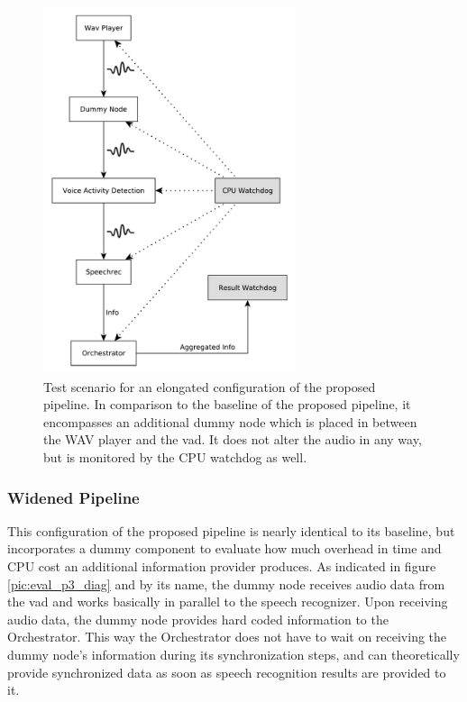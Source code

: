 \begin{figure}[]
	\centering
	\includegraphics[width=0.66\textwidth]{diagrams/eval_pipeline_4.pdf}
	\caption{Test scenario for an elongated configuration of the proposed pipeline.
		In comparison to the baseline of the proposed pipeline, it encompasses an additional dummy node which is placed in between the WAV player and the \gls{vad}.
		It does not alter the audio in any way, but is monitored by the CPU watchdog as well.}
	\label{pic:eval_p4_diag}
\end{figure}

\subsubsection{Widened Pipeline}
This configuration of the proposed pipeline is nearly identical to its baseline, but incorporates a dummy component to evaluate how much overhead in time and CPU cost an additional information provider produces.
As indicated in figure \ref{pic:eval_p3_diag} and by its name, the dummy node receives audio data from the \gls{vad} and works basically in parallel to the speech recognizer.
Upon receiving audio data, the dummy node provides hard coded information to the Orchestrator.
This way the Orchestrator does not have to wait on receiving the dummy node's information during its synchronization steps, and can theoretically provide synchronized data as soon as speech recognition results are provided to it.

